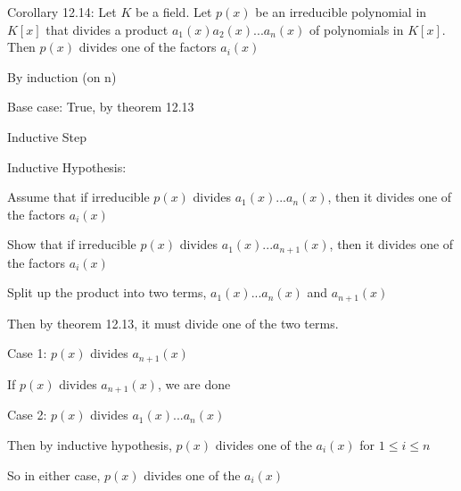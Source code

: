 \documentclass[12pt]{article}
\begin{document}
\begin{itemize}
Corollary 12.14: Let $K$ be a field. Let $p(x)$ be an irreducible polynomial in $K[x]$ that divides a product $a_1(x)a_2(x)...a_n(x)$ of polynomials in $K[x]$. Then $p(x)$ divides one of the factors $a_i(x)$

By induction (on n)

Base case: True, by theorem 12.13

Inductive Step

Inductive Hypothesis: 

Assume that if irreducible $p(x)$ divides $a_1(x)...a_n(x)$, then it divides one of the factors $a_i(x)$

Show that if irreducible $p(x)$ divides $a_1(x) ... a_{n+1}(x)$, then it divides one of the factors $a_i (x)$

Split up the product into two terms, $a_1(x)...a_n(x)$ and $a_{n+1}(x)$

Then by theorem 12.13, it must divide one of the two terms.

Case 1: $p(x)$ divides $a_{n+1}(x)$

If $p(x)$ divides $a_{n+1}(x)$, we are done

Case 2: $p(x)$ divides $a_1(x)...a_n(x)$

Then by inductive hypothesis, $p(x)$ divides one of the $a_i(x)$ for $1 \leq i \leq n$

So in either case, $p(x)$ divides one of the $a_i(x)$

\end{itemize}
\end{document}
